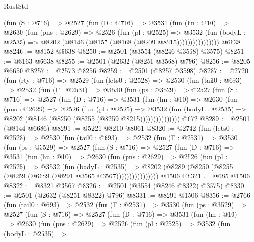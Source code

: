 \begin{lexlean}{RustStd}
\begin{coremodule}
                (fun (S : @716) =>
                @2527
                  (fun (D : @716) =>
                  @3531
                    (fun (hn : @10) =>
                    @2630
                      (fun (pns : @2629) =>
                      @2526
                        (fun (pl : @2525) =>
                        @3532
                          (fun (bodyL : @2535) =>
                          @8202 (@8146 (@8157 (@8168 (@8209 @8215))))))))))))))))
    @6638
@8246 := @8152 @6638
@8250 := @2501 (@3554 (@8246 @3568) @3575)
@8251 := @8163 @6638
@8255 := @2501 (@2632 (@8251 @3568) @796)
@8256 := @8205 @6650
@8257 := @2573 @8256
@8259 := @2501 (@8257 @3598)
@8287 := @2720
    (fun (rty : @716) =>
    @2529
      (fun (lets0 : @2528) =>
      @2530
        (fun (tail0 : @693) =>
        @2532
          (fun (Γ : @2531) =>
          @3530
            (fun (ps : @3529) =>
            @2527
              (fun (S : @716) =>
              @2527
                (fun (D : @716) =>
                @3531
                  (fun (hn : @10) =>
                  @2630
                    (fun (pns : @2629) =>
                    @2526
                      (fun (pl : @2525) =>
                      @3532
                        (fun (bodyL : @2535) =>
                        @8202 (@8146 (@8250 (@8255 (@8259 @8215)))))))))))))))
    @672
@8289 := @2501 (@8144 @6686)
@8291 := @5221 @8210 @8061
@8320 := @2742
    (fun (lets0 : @2528) =>
    @2530
      (fun (tail0 : @693) =>
      @2532
        (fun (Γ : @2531) =>
        @3530
          (fun (ps : @3529) =>
          @2527
            (fun (S : @716) =>
            @2527
              (fun (D : @716) =>
              @3531
                (fun (hn : @10) =>
                @2630
                  (fun (pns : @2629) =>
                  @2526
                    (fun (pl : @2525) =>
                    @3532
                      (fun (bodyL : @2535) =>
                      @8202 (@8289 (@8250 (@8255 (@8259 (@6689 (@8291 @3565 @3567))))))))))))))))
    @1506
@8321 := @685 @1506
@8322 := @8321 @3567
@8326 := @2501 (@3554 (@8246 @8322) @3575)
@8330 := @2501 (@2632 (@8251 @8322) @796)
@8331 := @8291 @1506
@8356 := @2766
    (fun (tail0 : @693) =>
    @2532
      (fun (Γ : @2531) =>
      @3530
        (fun (ps : @3529) =>
        @2527
          (fun (S : @716) =>
          @2527
            (fun (D : @716) =>
            @3531
              (fun (hn : @10) =>
              @2630
                (fun (pns : @2629) =>
                @2526
                  (fun (pl : @2525) =>
                  @3532
                    (fun (bodyL : @2535) =>

\end{coremodule}
\end{lexlean}
